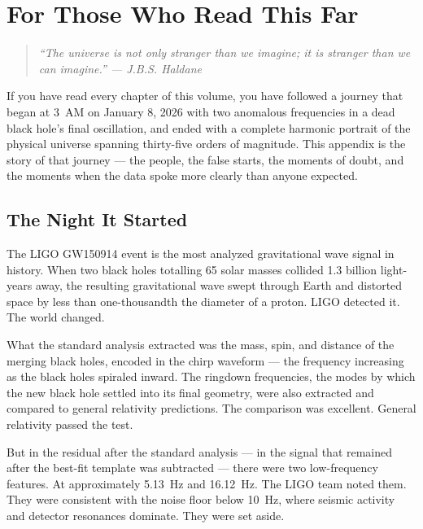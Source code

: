 \documentclass[11pt, letterpaper, openany]{book}
\begin{document}
\chapter{For Those Who Read This Far}

\begin{quote}
\textit{``The universe is not only stranger than we imagine; it is stranger than we can imagine.'' --- J.B.S. Haldane}
\end{quote}

If you have read every chapter of this volume, you have followed a journey that began at 3~AM on January 8, 2026 with two anomalous frequencies in a dead black hole's final oscillation, and ended with a complete harmonic portrait of the physical universe spanning thirty-five orders of magnitude.
This appendix is the story of that journey --- the people, the false starts, the moments of doubt, and the moments when the data spoke more clearly than anyone expected.

\section*{The Night It Started}

The LIGO GW150914 event is the most analyzed gravitational wave signal in history.
When two black holes totalling 65 solar masses collided 1.3 billion light-years away, the resulting gravitational wave swept through Earth and distorted space by less than one-thousandth the diameter of a proton.
LIGO detected it. The world changed.

What the standard analysis extracted was the mass, spin, and distance of the merging black holes, encoded in the chirp waveform --- the frequency increasing as the black holes spiraled inward.
The ringdown frequencies, the modes by which the new black hole settled into its final geometry, were also extracted and compared to general relativity predictions.
The comparison was excellent. General relativity passed the test.

But in the residual after the standard analysis --- in the signal that remained after the best-fit template was subtracted --- there were two low-frequency features.
At approximately 5.13~Hz and 16.12~Hz. The LIGO team noted them. They were consistent with the noise floor below 10~Hz, where seismic activity and detector resonances dominate.
They were set aside.
\end{document}
